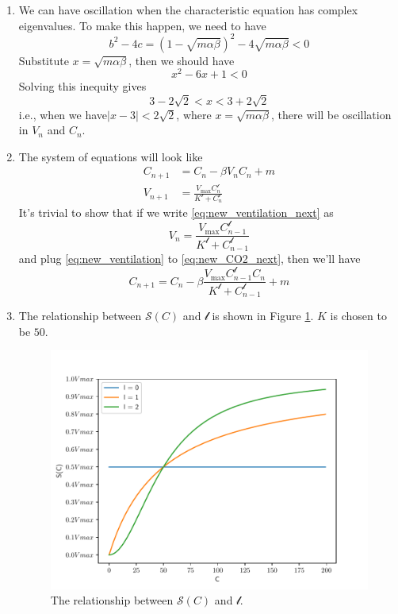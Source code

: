 \begin{homeworkProblem}
\begin{enumerate}
\item We can have oscillation when the characteristic equation has complex
eigenvalues. To make this happen, we need to have \[
    b^2 - 4c = (1 - \sqrt{m\alpha\beta})^2 - 4\sqrt{m\alpha\beta} < 0
\]
Substitute $x = \sqrt{m\alpha\beta}$, then we should have \[
    x^2 - 6x + 1 < 0
\]
Solving this inequity gives \[
    3 - 2\sqrt{2} < x < 3+2\sqrt{2}
\]i.e., when we have$|x-3| < 2\sqrt{2}$, where $x = \sqrt{m\alpha\beta}$, there
will be oscillation in $V_n$ and $C_n$.

\item The system of equations will look like \begin{align}
    C_{n+1} &= C_n - \beta V_nC_n + m \label{eq:new_CO2_next}\\
    V_{n+1} &= \frac{V_{\max}C^\mathcal{l}_n}{K^{\mathcal{l}}+C^\mathcal{l}_{n}}
    \label{eq:new_ventilation_next}
\end{align}
It's trivial to show that if we write \eqref{eq:new_ventilation_next} as 
\begin{equation}
    V_{n} = \frac{
        V_{\max}C^\mathcal{l}_{n-1}}{K^{\mathcal{l}}+C^\mathcal{l}_{n-1}}
    \label{eq:new_ventilation}
\end{equation}
and plug \eqref{eq:new_ventilation} to \eqref{eq:new_CO2_next}, then we'll have
\begin{equation}
    C_{n+1} = C_n - \beta \frac{
        V_{\max}C^\mathcal{l}_{n-1}C_n}{K^{\mathcal{l}}+C^\mathcal{l}_{n-1}}
        + m
\end{equation}

\item The relationship between $\mathcal{S}(C)$ and $\mathcal{l}$ is shown in
Figure \ref{fig:CO2_sensitivity}. $K$ is chosen to be $50$.
\begin{figure}
    \centering
    \caption[The relationship between $\mathcal{S}(C)$ and $\mathcal{l}$]{
        The relationship between $\mathcal{S}(C)$ and $\mathcal{l}$.
    }
    \label{fig:CO2_sensitivity}
    \includegraphics[scale=0.6]{fig/fig17(f).pdf}
\end{figure}


\end{enumerate}
\end{homeworkProblem}

